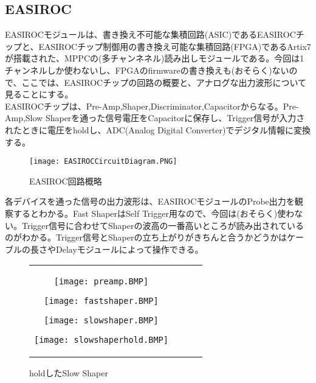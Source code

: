 \documentclass[10pt,a4j]{jarticle}
\begin{document}
\subsection{EASIROC}
EASIROCモジュールは、書き換え不可能な集積回路(ASIC)であるEASIROCチップと、EASIROCチップ制御用の書き換え可能な集積回路(FPGA)であるArtix7が搭載された、MPPCの(多チャンネネル)読み出しモジュールである。今回は1チャンネルしか使わないし、FPGAのfirmwareの書き換えも(おそらく)ないので、ここでは、EASIROCチップの回路の概要と、アナログな出力波形について見ることにする。\\
EASIROCチップは、Pre-Amp,Shaper,Discriminator,Capacitorからなる。Pre-Amp,Slow Shaperを通った信号電圧をCapacitorに保存し、Trigger信号が入力されたときに電圧をholdし、ADC(Analog Digital Converter)でデジタル情報に変換する。
\begin{figure}[h]
\begin{center}
\texttt{[image: EASIROCCircuitDiagram.PNG]}
\end{center}
\caption{EASIROC回路概略}
\end{figure}
各デバイスを通った信号の出力波形は、EASIROCモジュールのProbe出力を観察するとわかる。Fast ShaperはSelf Trigger用なので、今回は(おそらく)使わない。Trigger信号に合わせてShaperの波高の一番高いところが読み出されているのがわかる。Trigger信号とShaperの立ち上がりがきちんと合うかどうかはケーブルの長さやDelayモジュールによって操作できる。
\begin{figure}[h]
\begin{tabular}{cccc}
\begin{minipage}[t]{0.25\hsize}
\begin{center}
\texttt{[image: preamp.BMP]}
\end{center}
\caption{Pre-Amp}
\end{minipage}
\begin{minipage}[t]{0.25\hsize}
\begin{center}
\texttt{[image: fastshaper.BMP]}
\end{center}
\caption{Fast Shaper}
\end{minipage}
\begin{minipage}[t]{0.25\hsize}
\begin{center}
\texttt{[image: slowshaper.BMP]}
\end{center}
\caption{Slow Shaper}
\end{minipage}
\begin{minipage}[t]{0.25\hsize}
\begin{center}
\texttt{[image: slowshaperhold.BMP]}
\end{center}
\caption{holdしたSlow Shaper}
\end{minipage}
\end{tabular}
\end{figure}
\end{document}
